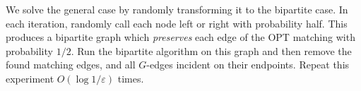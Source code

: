 \documentclass[11pt]{article}
\newcommand{\eps}{\varepsilon}
\begin{document}
%
%
We solve the general case by randomly transforming it to the bipartite case. In each iteration, randomly call each node left or right with probability half. This produces a bipartite graph which \emph{preserves} each edge of the OPT matching with probability $1/2$. Run the bipartite algorithm on this graph and then remove the found matching edges, and all $G$-edges incident on their endpoints. Repeat this experiment $O(\log 1/\eps)$ times.
\end{document}
